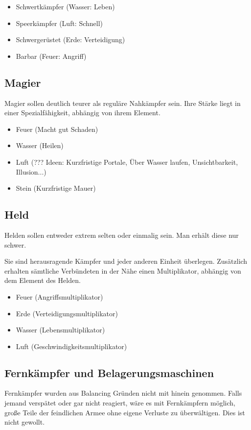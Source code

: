 \begin{itemize}
\item Schwertkämpfer (Wasser: Leben)
\item Speerkämpfer (Luft: Schnell)
\item Schwergerüstet (Erde: Verteidigung)
\item Barbar (Feuer: Angriff)
\end{itemize}

\subsection{Magier}
Magier sollen deutlich teurer als reguläre Nahkämpfer sein. Ihre Stärke liegt in einer Spezialfähigkeit, abhängig von ihrem Element. 

\begin{itemize}
\item Feuer (Macht gut Schaden)
\item Wasser (Heilen)
\item Luft (??? Ideen: Kurzfristige Portale, Über Wasser laufen, Unsichtbarkeit, Illusion...)
\item Stein (Kurzfristige Mauer)
\end{itemize}

\subsection{Held}
Helden sollen entweder extrem selten oder einmalig sein. Man erhält diese nur schwer.

Sie sind herausragende Kämpfer und jeder anderen Einheit überlegen. Zusätzlich erhalten sämtliche Verbündeten in der Nähe einen Multiplikator, abhängig von dem Element des Helden.

\begin{itemize}
\item Feuer (Angriffsmultiplikator)
\item Erde (Verteidigungsmultiplikator)
\item Wasser (Lebensmultiplikator)
\item Luft (Geschwindigkeitsmultiplikator)
\end{itemize}

\subsection{Fernkämpfer und Belagerungsmaschinen}
Fernkämpfer wurden aus Balancing Gründen nicht mit hinein genommen. Falls jemand verspätet oder gar nicht reagiert, wäre es mit Fernkämpfern möglich, große Teile der feindlichen Armee ohne eigene Verluste zu überwältigen. Dies ist nicht gewollt. 

